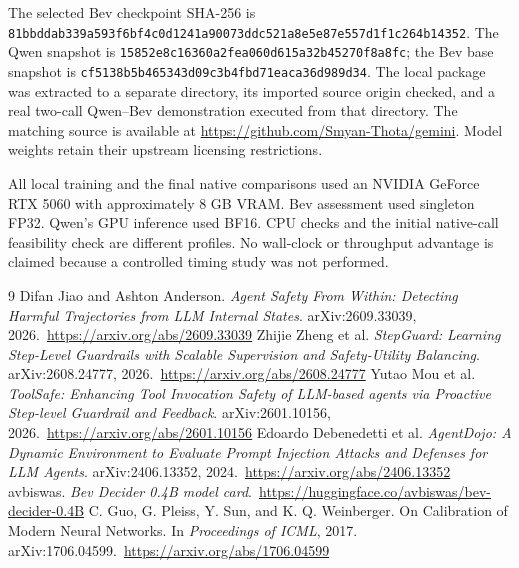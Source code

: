 \documentclass[11pt]{article}
\begin{document}
The selected Bev checkpoint SHA-256 is \nolinkurl{81bbddab339a593f6bf4c0d1241a90073ddc521a8e5e87e557d1f1c264b14352}. The Qwen snapshot is \nolinkurl{15852e8c16360a2fea060d615a32b45270f8a8fc}; the Bev base snapshot is \nolinkurl{cf5138b5b465343d09c3b4fbd71eaca36d989d34}. The local package was extracted to a separate directory, its imported source origin checked, and a real two-call Qwen--Bev demonstration executed from that directory. The matching source is available at \url{https://github.com/Smyan-Thota/gemini}. Model weights retain their upstream licensing restrictions.

All local training and the final native comparisons used an NVIDIA GeForce RTX 5060 with approximately 8 GB VRAM. Bev assessment used singleton FP32. Qwen's GPU inference used BF16. CPU checks and the initial native-call feasibility check are different profiles. No wall-clock or throughput advantage is claimed because a controlled timing study was not performed.

\clearpage
\begin{thebibliography}{9}
 Difan Jiao and Ashton Anderson. \emph{Agent Safety From Within: Detecting Harmful Trajectories from LLM Internal States}. arXiv:2609.33039, 2026.\
\url{https://arxiv.org/abs/2609.33039}
 Zhijie Zheng et al. \emph{StepGuard: Learning Step-Level Guardrails with Scalable Supervision and Safety-Utility Balancing}. arXiv:2608.24777, 2026.\
\url{https://arxiv.org/abs/2608.24777}
\bibitem{toolsafe} Yutao Mou et al. \emph{ToolSafe: Enhancing Tool Invocation Safety of LLM-based agents via Proactive Step-level Guardrail and Feedback}. arXiv:2601.10156, 2026.\
\url{https://arxiv.org/abs/2601.10156}
\bibitem{agentdojo} Edoardo Debenedetti et al. \emph{AgentDojo: A Dynamic Environment to Evaluate Prompt Injection Attacks and Defenses for LLM Agents}. arXiv:2406.13352, 2024.\
\url{https://arxiv.org/abs/2406.13352}
\bibitem{bev} avbiswas. \emph{Bev Decider 0.4B model card}.\
\url{https://huggingface.co/avbiswas/bev-decider-0.4B}
\bibitem{guo} C. Guo, G. Pleiss, Y. Sun, and K. Q. Weinberger. On Calibration of Modern Neural Networks. In \emph{Proceedings of ICML}, 2017. arXiv:1706.04599.\
\url{https://arxiv.org/abs/1706.04599}
\end{thebibliography}
\end{document}
